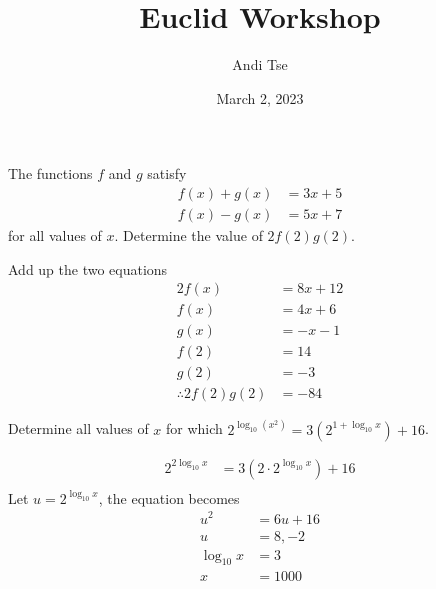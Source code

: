 \documentclass{article}
\title{Euclid Workshop}
\author{Andi Tse}
\date{March 2, 2023}
\begin{document}
\maketitle
\begin{custom-big}
The functions $f$ and $g$ satisfy
\begin{align*}
f(x) + g(x) &= 3x + 5\\
f(x) - g(x) &= 5x + 7
\end{align*}
for all values of $x$. Determine the value of $2f(2)g(2)$.
\end{custom-big}

\begin{solution}
Add up the two equations
\begin{align*}
    2f(x)&=8x+12\\
    f(x)&=4x+6\\
    g(x)&=-x-1\\
    f(2)&=14\\
    g(2)&=-3\\
    \therefore 2f(2)g(2)&=-84
\end{align*}
\end{solution}

\begin{custom-big}
Determine all values of $x$ for which $2^{\log_{10}\left(x^2\right)}=3\left(2^{1+\log_{10}x}\right)+16$.
\end{custom-big}

\begin{solution}
    \begin{align*}
        2^{2\log_{10}x}&=3\left(2\cdot 2^{\log_{10}x}\right)+16\\
    \end{align*}
    Let $u=2^{\log_{10}x}$, the equation becomes 
    \begin{align*}
        u^2&=6u+16\\
        u&=8,-2\\
        \log_{10}x&=3\\
        x&=1000
    \end{align*}
\end{solution}
\end{document}
